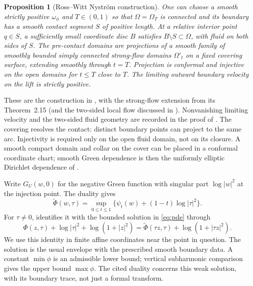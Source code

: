 \documentclass[11pt]{article}
\newtheorem{proposition}[theorem]{Proposition}
\begin{document}
\begin{proposition}[Ross--Witt Nystr\"om construction]\label{prop:input}
One can choose a smooth strictly positive $\omega_\phi$ and $T\in(0,1)$
so that $\Omega=\Omega_T$ is connected and its boundary has a smooth
contact segment $S$ of positive length. At a relative interior point
$q\in S$, a sufficiently small coordinate disc $B$ satisfies
$B\setminus S\subset\Omega$, with fluid on both sides of $S$.
The pre-contact domains are projections of a smooth family of smoothly
bounded simply connected strong-flow domains $\Omega'_t$ on a fixed covering
surface, extending smoothly through $t=T$. Projection is conformal and
injective on the open domains for $t\leq T$ close to $T$.
The limiting outward boundary velocity on the lift is strictly positive.
\end{proposition}

These are the construction in \cite[Proposition~3.4 and its proof]{applications},
with the strong-flow extension from its Theorem~2.15 (and the two-sided local
flow discussed in \cite[Remark~7.1]{moduli}). Nonvanishing limiting velocity
and the two-sided fluid geometry are recorded in the proof of
\cite[Theorem~6.2]{applications}. The covering resolves the contact:
distinct boundary points can project to the same arc. Injectivity is required
only on the open fluid domain, not on its closure. A smooth compact domain
and collar on the cover can be placed in a conformal coordinate chart;
smooth Green dependence is then the uniformly elliptic Dirichlet dependence
of \cite[Appendix~A]{applications}.

Write $G_U(w,0)$ for the negative Green function with singular part
$\log|w|^2$ at the injection point. The duality
\cite[Theorem~4.4]{applications} gives
\begin{equation}\label{eq:dual}
 \widetilde\Phi(w,\tau)
 =\sup_{0\leq t\leq1}\{\psi_t(w)+(1-t)\log|\tau|^2\}.
\end{equation}
For $\tau\ne0$, \cite[Proposition~4.2]{applications} identifies it with
the bounded solution in \eqref{eq:pde} through
\begin{equation}\label{eq:twist}
 \Phi(z,\tau)+\log|\tau|^2+\log(1+|z|^2)
 =\widetilde\Phi(\tau z,\tau)+\log(1+|\tau z|^2).
\end{equation}
We use this identity in finite affine coordinates near the point in question.
The solution is the usual envelope with the prescribed smooth boundary data.
A constant $\min\phi$ is an admissible lower bound; vertical subharmonic
comparison gives the upper bound $\max\phi$. The cited duality concerns this
weak solution, with its boundary trace, not just a formal transform.
\end{document}
